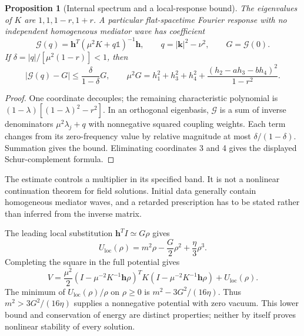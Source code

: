 \documentclass[aip,adv,reprint,onecolumn,amsmath,amssymb]{revtex4-2}
\newcommand{\Id}{\mathbb 1}
\newtheorem{proposition}[theorem]{Proposition}
\begin{document}
\begin{proposition}[Internal spectrum and a local-response bound]
The eigenvalues of $K$ are $1,1,1-r,1+r$. A particular flat-spacetime Fourier response with no independent homogeneous mediator wave has coefficient
\begin{equation}
 \mathcal G(q)=\bm h^T(\mu^2K+q\Id)^{-1}\bm h,\qquad q=|\bm k|^2-\nu^2,\qquad G=\mathcal G(0).
 \label{eq:response}
\end{equation}
If $\delta=|q|/[\mu^2(1-r)]<1$, then
\begin{equation}
 |\mathcal G(q)-G|\le\frac{\delta}{1-\delta}G,\qquad
 \mu^2G=h_1^2+h_3^2+h_4^2+\frac{(h_2-ah_3-bh_4)^2}{1-r^2}.
 \label{eq:response-bound}
\end{equation}
\end{proposition}
\begin{proof}
One coordinate decouples; the remaining characteristic polynomial is $(1-\lambda)[(1-\lambda)^2-r^2]$. In an orthogonal eigenbasis, $\mathcal G$ is a sum of inverse denominators $\mu^2\lambda_j+q$ with nonnegative squared coupling weights. Each term changes from its zero-frequency value by relative magnitude at most $\delta/(1-\delta)$. Summation gives the bound. Eliminating coordinates 3 and 4 gives the displayed Schur-complement formula.
\end{proof}
The estimate controls a multiplier in its specified band. It is not a nonlinear continuation theorem for field solutions. Initial data generally contain homogeneous mediator waves, and a retarded prescription has to be stated rather than inferred from the inverse matrix.

The leading local substitution $\bm h^TI\simeq G\rho$ gives
\begin{equation}
 U_{\mathrm{loc}}(\rho)=m^2\rho-\frac G2\rho^2+\frac\eta3\rho^3.
 \label{eq:local-potential}
\end{equation}
Completing the square in the full potential gives
\begin{equation}
 V=\frac{\mu^2}{2}\left(I-\mu^{-2}K^{-1}\bm h\rho\right)^TK
 \left(I-\mu^{-2}K^{-1}\bm h\rho\right)+U_{\mathrm{loc}}(\rho).
 \label{eq:square}
\end{equation}
The minimum of $U_{\mathrm{loc}}(\rho)/\rho$ on $\rho\ge0$ is $m^2-3G^2/(16\eta)$. Thus $m^2>3G^2/(16\eta)$ supplies a nonnegative potential with zero vacuum. This lower bound and conservation of energy are distinct properties; neither by itself proves nonlinear stability of every solution.
\end{document}
